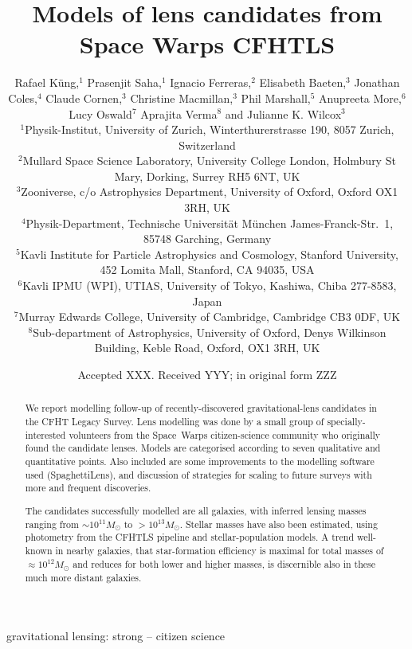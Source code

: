 \documentclass[fleqn,usenatbib]{template/mnras}
\title[Lens models for Space Warps CFHTLS]{Models of lens candidates from
  Space Warps CFHTLS}
\author[K\"ung et al]{Rafael K\"ung,$^{1}$
Prasenjit Saha,$^{1}$
Ignacio Ferreras,$^{2}$
Elisabeth Baeten,$^{3}$
\newauthor
Jonathan Coles,$^{4}$
Claude Cornen,$^{3}$
Christine Macmillan,$^{3}$
Phil Marshall,$^{5}$ 
\newauthor
Anupreeta More,$^{6}$
Lucy Oswald$^{7}$
Aprajita Verma$^{8}$
and Julianne K. Wilcox$^{3}$
%
\\
%
$^{1}$Physik-Institut, University of Zurich, Winterthurerstrasse 190, 8057 Zurich, Switzerland\\
$^{2}$Mullard Space Science Laboratory, University College London, Holmbury St Mary, Dorking, Surrey RH5 6NT, UK\\
$^{3}$Zooniverse, c/o Astrophysics Department, University of Oxford, Oxford OX1 3RH, UK \\
$^{4}$Physik-Department, Technische Universit\"at M\"unchen
James-Franck-Str.~1, 85748 Garching, Germany\\
$^{5}$Kavli Institute for Particle Astrophysics and Cosmology, Stanford University, 452 Lomita Mall, Stanford, CA 94035, USA\\
$^{6}$Kavli IPMU (WPI), UTIAS, University of Tokyo, Kashiwa, Chiba 277-8583, Japan\\
$^{7}$Murray Edwards College, University of Cambridge, Cambridge CB3 0DF, UK\\
$^{8}$Sub-department of Astrophysics, University of Oxford, Denys Wilkinson Building, Keble Road, Oxford, OX1 3RH, UK\\
}
\date{Accepted XXX. Received YYY; in original form ZZZ}
\begin{document}
\label{firstpage}
\pagerange{\pageref{firstpage}--\pageref{lastpage}}
\maketitle

\begin{abstract}
We report modelling follow-up of recently-discovered
gravitational-lens candidates in the CFHT Legacy Survey.  Lens
modelling was done by a small group of specially-interested volunteers
from the Space~Warps citizen-science community who originally found
the candidate lenses.  Models are categorised according to seven
qualitative and quantitative points.  Also included are some
improvements to the modelling software used (SpaghettiLens),
and discussion of strategies for scaling to future surveys
with more and frequent discoveries.

The candidates successfully modelled are all galaxies, with inferred
lensing masses ranging from $\sim10^{11}M_\odot$ to $>10^{13}M_\odot$.
Stellar masses have also been estimated, using photometry from the
CFHTLS pipeline and stellar-population models.  A trend well-known
in nearby galaxies, that star-formation efficiency is maximal for
total masses of $\approx10^{12}M_\odot$ and reduces for both lower and
higher masses, is discernible also in these much more distant
galaxies.
\end{abstract}

\begin{keywords}
gravitational lensing: strong -- citizen science
\end{keywords}



% 















\clearpage



\clearpage

\appendix




\bsp	%
\label{lastpage}
\end{document}
